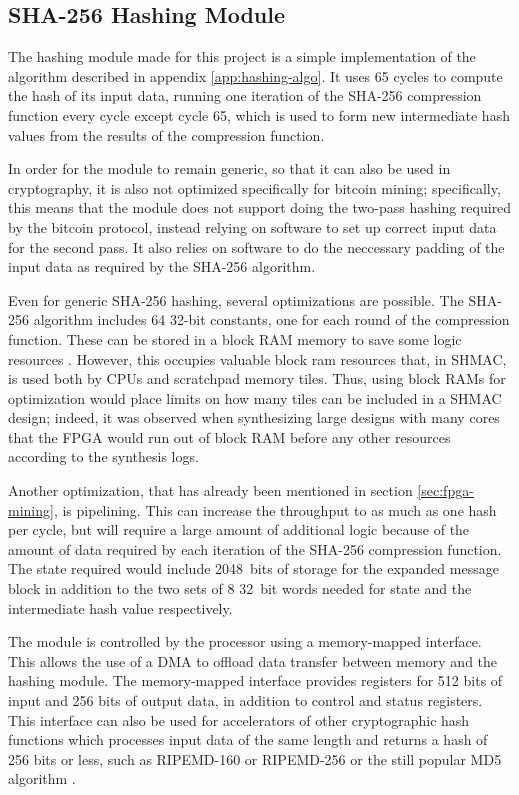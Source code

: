 \subsection{SHA-256 Hashing Module}
The hashing module made for this project is a simple implementation of the algorithm described in
appendix \ref{app:hashing-algo}. It uses 65 cycles to compute the hash of its input data, running
one iteration of the SHA-256 compression function every cycle except cycle 65, which is used to
form new intermediate hash values from the results of the compression function.

In order for the module to remain generic, so that it can also be used in cryptography, it
is also not optimized specifically for bitcoin mining; specifically, this means that the module
does not support doing the two-pass hashing required by the bitcoin protocol, instead relying
on software to set up correct input data for the second pass. It also relies on software to
do the neccessary padding of the input data as required by the SHA-256 algorithm.

Even for generic SHA-256 hashing, several optimizations are possible. The SHA-256 algorithm
includes 64 32-bit constants, one for each round of the compression function. These can be
stored in a block RAM memory to save some logic resources \cite{optimizing-sha2}. However, this occupies valuable
block ram resources that, in SHMAC, is used both by CPUs and scratchpad memory tiles. Thus,
using block RAMs for optimization would place limits on how many tiles can be included in
a SHMAC design; indeed, it was observed when synthesizing large designs with many cores
that the FPGA would run out of block RAM before any other resources according to the synthesis logs.

Another optimization, that has already been mentioned in section \ref{sec:fpga-mining}, is
pipelining. This can increase the throughput to as much as one hash per cycle, but will require
a large amount of additional logic because of the amount of data required by each iteration
of the SHA-256 compression function. The state required would include 2048~bits of storage
for the expanded message block in addition to the two sets of 8 32~bit words needed for
state and the intermediate hash value respectively.

The module is controlled by the processor using a memory-mapped interface. This allows the use
of a DMA to offload data transfer between memory and the hashing module. The memory-mapped interface
provides registers for 512 bits of input and 256 bits of output data, in addition to control and
status registers. This interface can also be used for accelerators of other cryptographic hash
functions which processes input data of the same length and returns a hash of 256 bits or less,
such as RIPEMD-160 or RIPEMD-256 \cite{ripemd} or the still popular MD5 algorithm \cite{md5}.

